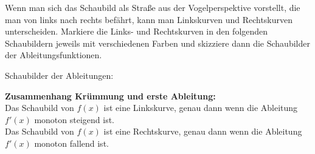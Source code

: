 Wenn man sich das Schaubild als Straße aus der Vogelperspektive vorstellt, die man von links nach rechts befährt, kann man Linkskurven und Rechtskurven unterscheiden. Markiere die Links- und Rechtskurven in den folgenden Schaubildern jeweils mit verschiedenen Farben und skizziere dann die Schaubilder der Ableitungsfunktionen.\\
\begin{minipage}{\textwidth}
\end{minipage}
Schaubilder der Ableitungen:\\
\begin{minipage}{\textwidth}
\end{minipage}
\begin{tcolorbox}
	\textbf{Zusammenhang Krümmung und erste Ableitung:}\\
	\textcolor{loestc}{Das Schaubild von \(f(x)\) ist eine Linkskurve, genau dann wenn die Ableitung \(f'(x)\) monoton steigend ist.\\
		Das Schaubild von \(f(x)\) ist eine Rechtskurve, genau dann wenn die Ableitung \(f'(x)\) monoton fallend ist.\\}
\end{tcolorbox}
